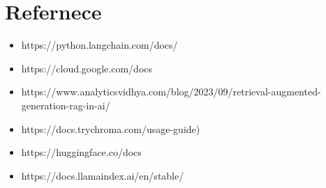 \documentclass[12pt,a4paper,oneside]{report}
\begin{document}
\newpage
\chapter{Refernece}
\begin{itemize}
\item{https://python.langchain.com/docs/}
\item{https://cloud.google.com/docs}
\item{https://www.analyticsvidhya.com/blog/2023/09/retrieval-augmented-generation-rag-in-ai/}
\item{https://docs.trychroma.com/usage-guide)}
\item{https://huggingface.co/docs}
\item{https://docs.llamaindex.ai/en/stable/}
\end{itemize}
\end{document}
